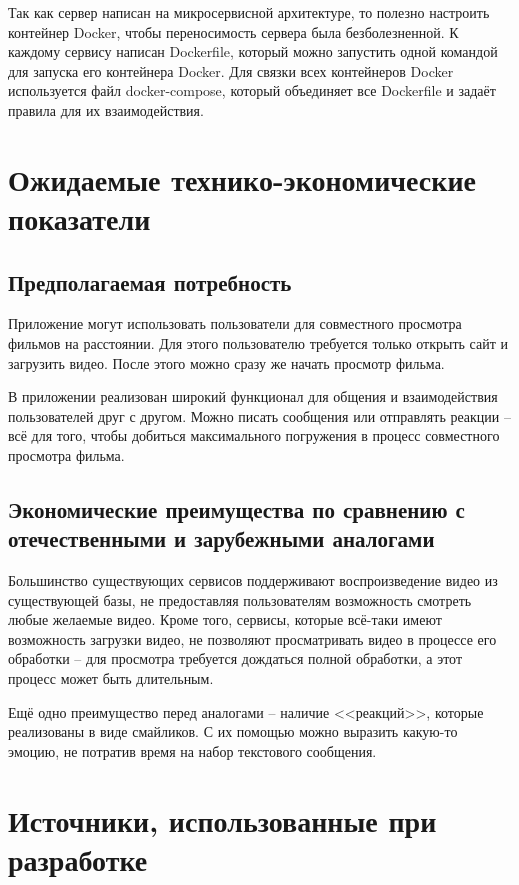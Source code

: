 \documentclass{../includes/TechDoc}
\begin{document}
    Так как сервер написан на микросервисной архитектуре, то полезно настроить контейнер Docker, чтобы переносимость сервера была безболезненной.
    К каждому сервису написан Dockerfile, который можно запустить одной командой для запуска его контейнера Docker.
    Для связки всех контейнеров Docker используется файл docker-compose, который объединяет все Dockerfile и задаёт правила для их взаимодействия.


    \section{Ожидаемые технико-экономические показатели}

    \subsection{Предполагаемая потребность}

    Приложение могут использовать пользователи для совместного просмотра фильмов на расстоянии.
    Для этого пользователю требуется только открыть сайт и загрузить видео.
    После этого можно сразу же начать просмотр фильма.

    В приложении реализован широкий функционал для общения и взаимодействия пользователей друг с другом.
    Можно писать сообщения или отправлять реакции -- всё для того, чтобы добиться максимального погружения в процесс совместного просмотра фильма.

    \subsection{Экономические преимущества по сравнению с отечественными и зарубежными аналогами}

    Большинство существующих сервисов поддерживают воспроизведение видео из существующей базы, не предоставляя пользователям возможность смотреть любые желаемые видео.
    Кроме того, сервисы, которые всё-таки имеют возможность загрузки видео, не позволяют просматривать видео в процессе его обработки -- для просмотра требуется дождаться полной обработки, а этот процесс может быть длительным.

    Ещё одно преимущество перед аналогами -- наличие <<реакций>>, которые реализованы в виде смайликов.
    С их помощью можно выразить какую-то эмоцию, не потратив время на набор текстового сообщения.

    \clearpage


    \section{Источники, использованные при разработке}
\end{document}
